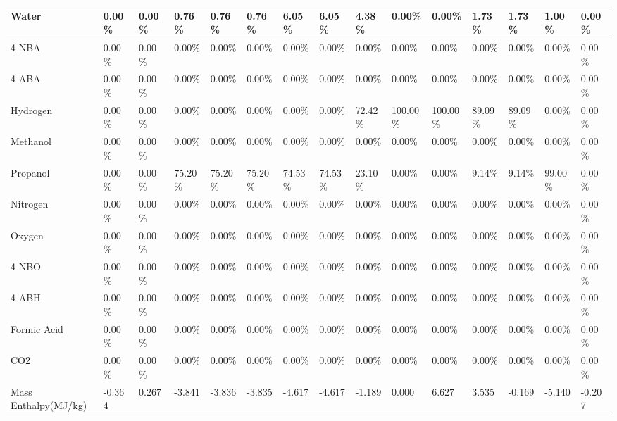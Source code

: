 \begin{landscape}
\begin{table}[H]
\begin{tabular}{|l|l|l|l|l|l|l|l|l|l|l|l|l|l|l|}
Water                   & 0.00\%  & 0.00\%  & 0.76\%  & 0.76\%  & 0.76\%  & 6.05\%  & 6.05\%  & 4.38\%  & 0.00\%   & 0.00\%   & 1.73\%  & 1.73\%  & 1.00\%  & 0.00\%   \\ \hline
4-NBA                   & 0.00\%  & 0.00\%  & 0.00\%  & 0.00\%  & 0.00\%  & 0.00\%  & 0.00\%  & 0.00\%  & 0.00\%   & 0.00\%   & 0.00\%  & 0.00\%  & 0.00\%  & 0.00\%   \\ \hline
4-ABA                   & 0.00\%  & 0.00\%  & 0.00\%  & 0.00\%  & 0.00\%  & 0.00\%  & 0.00\%  & 0.00\%  & 0.00\%   & 0.00\%   & 0.00\%  & 0.00\%  & 0.00\%  & 0.00\%   \\ \hline
Hydrogen                & 0.00\%  & 0.00\%  & 0.00\%  & 0.00\%  & 0.00\%  & 0.00\%  & 0.00\%  & 72.42\% & 100.00\% & 100.00\% & 89.09\% & 89.09\% & 0.00\%  & 0.00\%   \\ \hline
Methanol                & 0.00\%  & 0.00\%  & 0.00\%  & 0.00\%  & 0.00\%  & 0.00\%  & 0.00\%  & 0.00\%  & 0.00\%   & 0.00\%   & 0.00\%  & 0.00\%  & 0.00\%  & 0.00\%   \\ \hline
Propanol                & 0.00\%  & 0.00\%  & 75.20\% & 75.20\% & 75.20\% & 74.53\% & 74.53\% & 23.10\% & 0.00\%   & 0.00\%   & 9.14\%  & 9.14\%  & 99.00\% & 0.00\%   \\ \hline
Nitrogen                & 0.00\%  & 0.00\%  & 0.00\%  & 0.00\%  & 0.00\%  & 0.00\%  & 0.00\%  & 0.00\%  & 0.00\%   & 0.00\%   & 0.00\%  & 0.00\%  & 0.00\%  & 0.00\%   \\ \hline
Oxygen                  & 0.00\%  & 0.00\%  & 0.00\%  & 0.00\%  & 0.00\%  & 0.00\%  & 0.00\%  & 0.00\%  & 0.00\%   & 0.00\%   & 0.00\%  & 0.00\%  & 0.00\%  & 0.00\%   \\ \hline
4-NBO                   & 0.00\%  & 0.00\%  & 0.00\%  & 0.00\%  & 0.00\%  & 0.00\%  & 0.00\%  & 0.00\%  & 0.00\%   & 0.00\%   & 0.00\%  & 0.00\%  & 0.00\%  & 0.00\%   \\ \hline
4-ABH                   & 0.00\%  & 0.00\%  & 0.00\%  & 0.00\%  & 0.00\%  & 0.00\%  & 0.00\%  & 0.00\%  & 0.00\%   & 0.00\%   & 0.00\%  & 0.00\%  & 0.00\%  & 0.00\%   \\ \hline
Formic Acid             & 0.00\%  & 0.00\%  & 0.00\%  & 0.00\%  & 0.00\%  & 0.00\%  & 0.00\%  & 0.00\%  & 0.00\%   & 0.00\%   & 0.00\%  & 0.00\%  & 0.00\%  & 0.00\%   \\ \hline
CO2                     & 0.00\%  & 0.00\%  & 0.00\%  & 0.00\%  & 0.00\%  & 0.00\%  & 0.00\%  & 0.00\%  & 0.00\%   & 0.00\%   & 0.00\%  & 0.00\%  & 0.00\%  & 0.00\%   \\ \hline
Mass Enthalpy(MJ/kg)    & -0.364  & 0.267   & -3.841  & -3.836  & -3.835  & -4.617  & -4.617  & -1.189  & 0.000    & 6.627    & 3.535   & -0.169  & -5.140  & -0.207   \\ \hline
\end{tabular}
\end{table}


\end{landscape}
